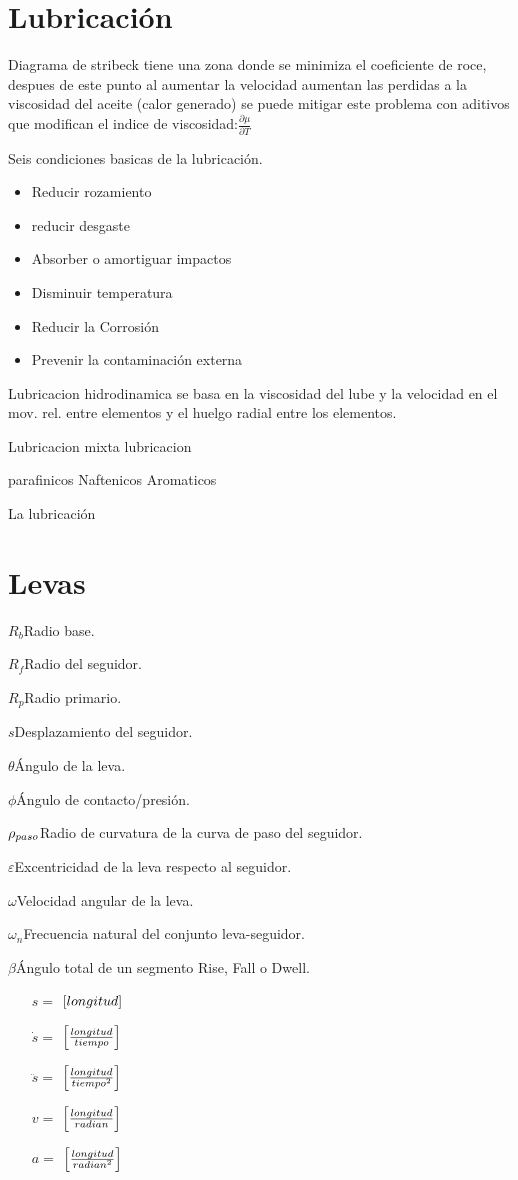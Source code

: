 \documentclass[twocolumn,10pt]{article}
\newcommand{\rmit}[1]{{\fontfamily{cmr}\selectfont #1}}
\newcommand{\glossentry}[2]{$#1$\indent #2 \par \vspace{.4cm} } %
\newcommand{\Fall}{\rmit{Fall}}
\newcommand{\Rise}{\rmit{Rise}}
\newcommand{\Dwell}{\rmit{Dwell}}
\begin{document}
\section{Lubricación}
Diagrama de stribeck tiene una zona donde se minimiza el coeficiente de roce, despues de este punto al aumentar la velocidad aumentan las perdidas a la viscosidad del aceite (calor generado) se puede mitigar este problema con aditivos que modifican el indice de viscosidad:$\frac{\partial \mu}{\partial T}$

Seis condiciones basicas de la lubricación.
\begin{itemize}
\item Reducir rozamiento
\item reducir desgaste
\item Absorber o amortiguar impactos
\item Disminuir temperatura
\item Reducir la Corrosión 
\item Prevenir la contaminación externa
\end{itemize}
Lubricacion hidrodinamica se basa en la viscosidad del lube y la velocidad en el mov. rel. entre elementos y el huelgo radial entre los elementos.

Lubricacion mixta
lubricacion 

parafinicos
Naftenicos
Aromaticos

La lubricación

\section{Levas}
\glossentry{R_b}{Radio base.}
\glossentry{R_f}{Radio del seguidor.}
\glossentry{R_p}{Radio primario.}
\glossentry{s}{Desplazamiento del seguidor.}
\glossentry{\theta}{Ángulo de la leva.}
\glossentry{\phi}{Ángulo de contacto/presión.}
\glossentry{\rho_\rmit{paso}}{Radio de curvatura de la curva de paso del seguidor.}
\glossentry{\varepsilon}{Excentricidad de la leva respecto al seguidor.}
\glossentry{\omega}{Velocidad angular de la leva.}
\glossentry{\omega_n}{Frecuencia natural del conjunto leva-seguidor.}
\glossentry{\beta}{Ángulo total de un segmento \Rise{}, \Fall{} o \Dwell.}
\begin{itemize}
    \item[$s=$] $\left[\rmit{longitud}\right]$
    \item[$\dot{s}=$] $\left[\frac{\rmit{longitud}}{\rmit{tiempo}}\right]$
    \item[$\ddot{s}=$] $\left[\frac{\rmit{longitud}}{\rmit{tiempo}^2}\right]$ 
    \item[$v=$] $\left[\frac{\rmit{longitud}}{\rmit{radian}}\right]$
    \item[$a=$] $\left[\frac{\rmit{longitud}}{\rmit{radian}^2}\right]$ 
\end{itemize}
\end{document}
